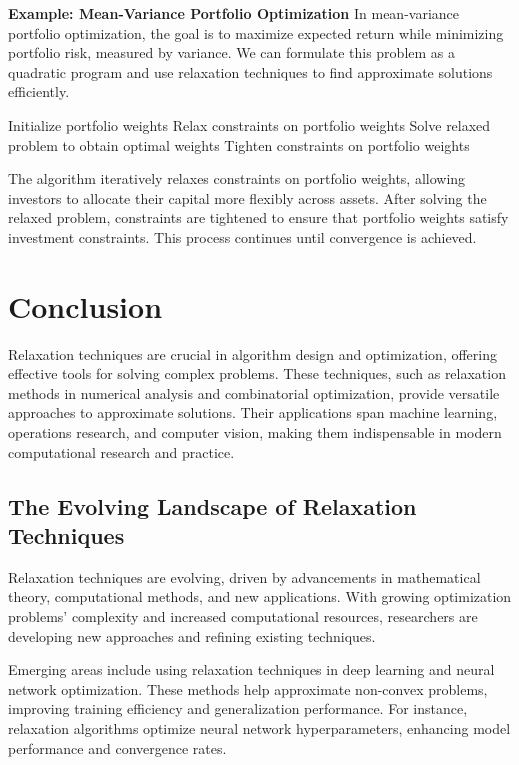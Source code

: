 \documentclass[12pt]{book} %
\begin{document}
\textbf{Example: Mean-Variance Portfolio Optimization}
In mean-variance portfolio optimization, the goal is to maximize expected return while minimizing portfolio risk, measured by variance. We can formulate this problem as a quadratic program and use relaxation techniques to find approximate solutions efficiently.
\FloatBarrier
\begin{algorithm}
\caption{Relaxation-based Mean-Variance Portfolio Optimization}
\begin{algorithmic}[1]
\State Initialize portfolio weights
\Repeat
    \State Relax constraints on portfolio weights
    \State Solve relaxed problem to obtain optimal weights
    \State Tighten constraints on portfolio weights
\end{algorithmic}
\end{algorithm}
\FloatBarrier
The algorithm iteratively relaxes constraints on portfolio weights, allowing investors to allocate their capital more flexibly across assets. After solving the relaxed problem, constraints are tightened to ensure that portfolio weights satisfy investment constraints. This process continues until convergence is achieved.


\section{Conclusion}

Relaxation techniques are crucial in algorithm design and optimization, offering effective tools for solving complex problems. These techniques, such as relaxation methods in numerical analysis and combinatorial optimization, provide versatile approaches to approximate solutions. Their applications span machine learning, operations research, and computer vision, making them indispensable in modern computational research and practice.

\subsection{The Evolving Landscape of Relaxation Techniques}

Relaxation techniques are evolving, driven by advancements in mathematical theory, computational methods, and new applications. With growing optimization problems' complexity and increased computational resources, researchers are developing new approaches and refining existing techniques.

Emerging areas include using relaxation techniques in deep learning and neural network optimization. These methods help approximate non-convex problems, improving training efficiency and generalization performance. For instance, relaxation algorithms optimize neural network hyperparameters, enhancing model performance and convergence rates.
\end{document}
